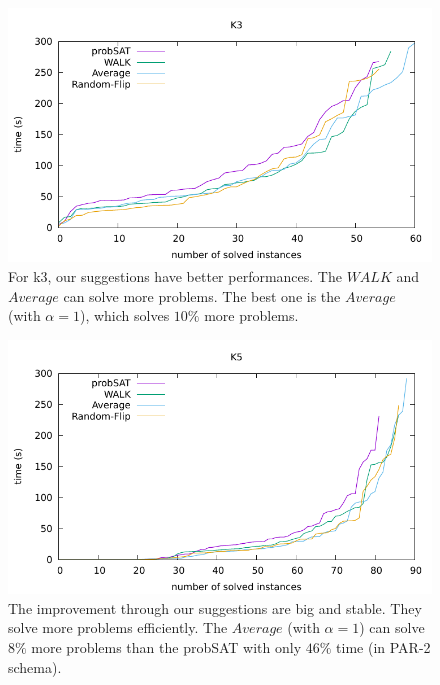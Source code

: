 \documentclass[12pt,a4paper,twoside]{scrartcl}
\numberwithin{equation}{section}
\begin{document}
\begin{figure}[H]
\begin{center}
  \includegraphics[scale = 1]{DATA/K3/e2.pdf}
  \end{center}
  \caption{For k3, our suggestions have better performances. The $WALK$ and $Average$ can solve more problems. The best one is the $Average$ (with $\alpha = 1$), which solves $10\%$ more problems.}
  \label{Experiment 2 k3 cactus plot}
  \end{figure}
  \begin{figure}[H]
\begin{center}
  \includegraphics[scale = 1]{DATA/K5/e2.pdf}
  \end{center}
  \caption{The improvement through our suggestions are big and stable. They solve more problems efficiently. The $Average$ (with $\alpha = 1$) can solve $8\%$ more problems than the probSAT with only $46\%$ time (in PAR-2 schema). }
  \label{Experiment 2 k5 cactus plot}
  \end{figure}
\end{document}
